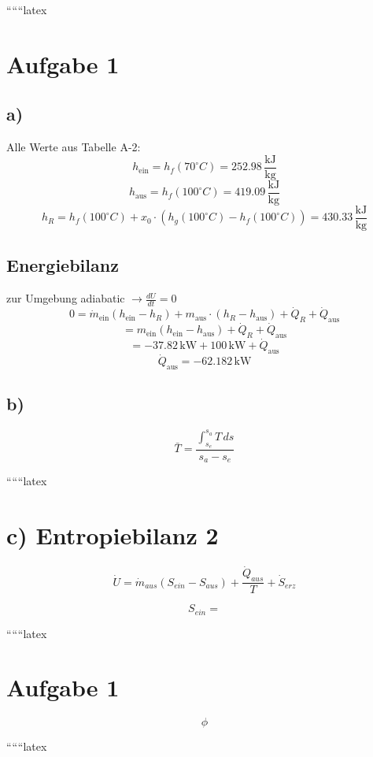 
``````latex


\section*{Aufgabe 1}

\subsection*{a)}
Alle Werte aus Tabelle A-2:
\[
h_{\text{ein}} = h_f(70^\circ C) = 252.98 \, \frac{\text{kJ}}{\text{kg}}
\]
\[
h_{\text{aus}} = h_f(100^\circ C) = 419.09 \, \frac{\text{kJ}}{\text{kg}}
\]
\[
h_R = h_f(100^\circ C) + x_0 \cdot (h_g(100^\circ C) - h_f(100^\circ C)) = 430.33 \, \frac{\text{kJ}}{\text{kg}}
\]

\subsection*{Energiebilanz}
zur Umgebung adiabatic $\rightarrow \frac{dU}{dt} = 0$
\[
0 = \dot{m}_{\text{ein}} (h_{\text{ein}} - h_R) + m_{\text{aus}} \cdot (h_R - h_{\text{aus}}) + \dot{Q}_R + \dot{Q}_{\text{aus}}
\]
\[
= m_{\text{ein}} (h_{\text{ein}} - h_{\text{aus}}) + \dot{Q}_R + \dot{Q}_{\text{aus}}
\]
\[
= -37.82 \, \text{kW} + 100 \, \text{kW} + \dot{Q}_{\text{aus}}
\]
\[
\dot{Q}_{\text{aus}} = -62.182 \, \text{kW}
\]

\subsection*{b)}
\[
\bar{T} = \frac{\int_{s_e}^{s_a} T \, ds}{s_a - s_e}
\]

``````latex


\section*{c) Entropiebilanz 2}

\[
\dot{U} = \dot{m}_{aus} \left( S_{ein} - S_{aus} \right) + \frac{\dot{Q}_{aus}}{T} + \dot{S}_{erz}
\]

\[
S_{ein} =
\]

``````latex


\section*{Aufgabe 1}

\begin{equation}
\phi
\end{equation}

``````latex


